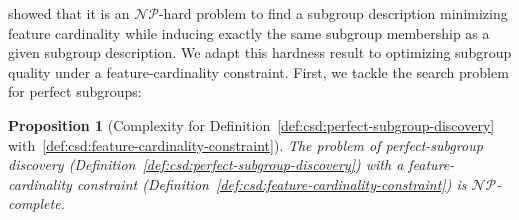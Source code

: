 \documentclass[acmsmall]{acmart} %
\theoremstyle{acmplain}
\newtheorem{proposition}{Proposition}
\theoremstyle{acmdefinition}
\begin{document}
\cite{boley2009non} showed that it is an $\mathcal{NP}$-hard problem to find a subgroup description minimizing feature cardinality while inducing exactly the same subgroup membership as a given subgroup description.
We adapt this hardness result to optimizing subgroup quality under a feature-cardinality constraint.
First, we tackle the search problem for perfect subgroups:
%
\begin{proposition}[Complexity for Definition~\ref{def:csd:perfect-subgroup-discovery} with~\ref{def:csd:feature-cardinality-constraint}]
	The problem of perfect-subgroup discovery (Definition~\ref{def:csd:perfect-subgroup-discovery}) with a feature-cardinality constraint (Definition~\ref{def:csd:feature-cardinality-constraint}) is $\mathcal{NP}$-complete.
	\label{prop:csd:complexity-cardinality-np-perfect-subgroup}
\end{proposition}
%
\end{document}
